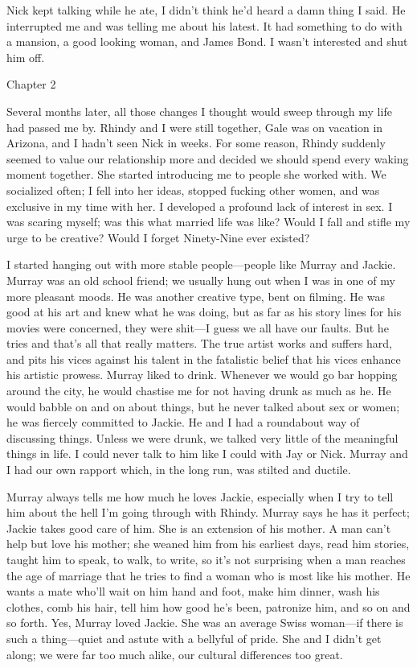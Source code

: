Nick kept talking while he ate, I didn't think he'd heard a damn thing I
said. He interrupted me and was telling me about his latest. It had
something to do with a mansion, a good looking woman, and James Bond. I
wasn't interested and shut him off.

Chapter 2

Several months later, all those changes I thought would sweep through my
life had passed me by. Rhindy and I were still together, Gale was on
vacation in Arizona, and I hadn't seen Nick in weeks. For some reason,
Rhindy suddenly seemed to value our relationship more and decided we
should spend every waking moment together. She started introducing me to
people she worked with. We socialized often; I fell into her ideas,
stopped fucking other women, and was exclusive in my time with her. I
developed a profound lack of interest in sex. I was scaring myself; was
this what married life was like? Would I fall and stifle my urge to be
creative? Would I forget Ninety-Nine ever existed?

I started hanging out with more stable people---people like Murray and
Jackie. Murray was an old school friend; we usually hung out when I was
in one of my more pleasant moods. He was another creative type, bent on
filming. He was good at his art and knew what he was doing, but as far
as his story lines for his movies were concerned, they were shit---I
guess we all have our faults. But he tries and that's all that really
matters. The true artist works and suffers hard, and pits his vices
against his talent in the fatalistic belief that his vices enhance his
artistic prowess. Murray liked to drink. Whenever we would go bar
hopping around the city, he would chastise me for not having drunk as
much as he. He would babble on and on about things, but he never talked
about sex or women; he was fiercely committed to Jackie. He and I had a
roundabout way of discussing things. Unless we were drunk, we talked
very little of the meaningful things in life. I could never talk to him
like I could with Jay or Nick. Murray and I had our own rapport which,
in the long run, was stilted and ductile.

Murray always tells me how much he loves Jackie, especially when I try
to tell him about the hell I'm going through with Rhindy. Murray says he
has it perfect; Jackie takes good care of him. She is an extension of
his mother. A man can't help but love his mother; she weaned him from
his earliest days, read him stories, taught him to speak, to walk, to
write, so it's not surprising when a man reaches the age of marriage
that he tries to find a woman who is most like his mother. He wants a
mate who'll wait on him hand and foot, make him dinner, wash his
clothes, comb his hair, tell him how good he's been, patronize him, and
so on and so forth. Yes, Murray loved Jackie. She was an average Swiss
woman---if there is such a thing---quiet and astute with a bellyful of
pride. She and I didn't get along; we were far too much alike, our
cultural differences too great.

